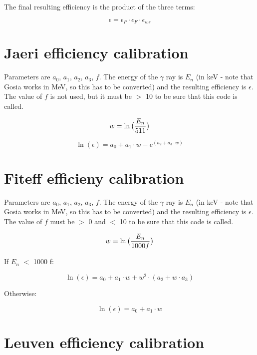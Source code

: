 The final resulting efficiency is the product of the three terms:

\begin{equation}
\epsilon = \epsilon_P \cdot \epsilon_F \cdot \epsilon_{ws}
\end{equation}

\section{Jaeri efficiency calibration}

Parameters are $a_0$, $a_1$, $a_2$, $a_3$, $f$. The energy of the $\gamma$
ray is $E_n$ (in keV - note that Gosia works in MeV, so this has to be
converted) and the resulting efficiency is $\epsilon$. The value of $f$ is
not used, but it must be $>$ 10 to be sure that this code is called.

\begin{equation}
w = \ln\big({E_n \over 511}\big)
\end{equation}

\begin{equation}
\ln(\epsilon) = a_0 + a_1 \cdot w - e^{(a_2 + a_3 \cdot w)}
\end{equation}

\section{Fiteff efficieny calibration}

Parameters are $a_0$, $a_1$, $a_2$, $a_3$, $f$. The energy of the $\gamma$
ray is $E_n$ (in keV - note that Gosia works in MeV, so this has to be
converted) and the resulting efficiency is $\epsilon$. The value of $f$ must
be $>$ 0 and $<$ 10 to be sure that this code is called.

\begin{equation}
w = \ln\big({E_n \over 1000 f}\big)
\end{equation}

If $E_n$ $<$ 1000 f:

\begin{equation}
\ln(\epsilon) = a_0 + a_1 \cdot w + w^2 \cdot (a_2 + w \cdot a_3)
\end{equation}

Otherwise:

\begin{equation}
\ln(\epsilon) = a_0 + a_1 \cdot w
\end{equation}

\section{Leuven efficiency calibration}

